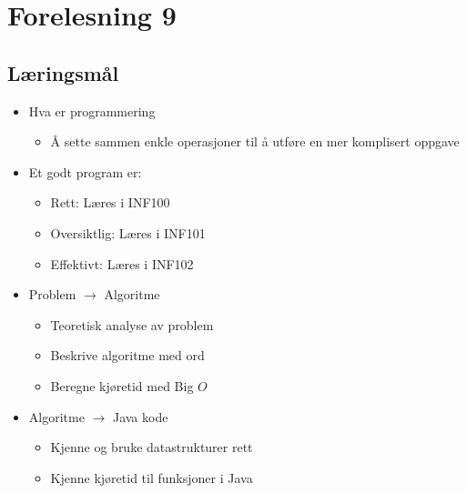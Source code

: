 \documentclass{article}
\begin{document}
    \section{Forelesning 9}
    \subsection{Læringsmål}

    \begin{itemize}
        \item Hva er programmering
            \begin{itemize}
                \item Å sette sammen enkle operasjoner til å utføre en mer komplisert oppgave
            \end{itemize}
        \item Et godt program er:
            \begin{itemize}
                \item Rett: Læres i INF100
                \item Oversiktlig: Læres i INF101
                \item Effektivt: Læres i INF102
            \end{itemize}
        \item Problem \( \rightarrow \) Algoritme
            \begin{itemize}
                \item Teoretisk analyse av problem
                \item Beskrive algoritme med ord
                \item Beregne kjøretid med Big \( O \)
            \end{itemize}
        \item Algoritme \( \rightarrow \) Java kode
            \begin{itemize}
                \item Kjenne og bruke datastrukturer rett
                \item Kjenne kjøretid til funksjoner i Java
            \end{itemize}
    \end{itemize}
\end{document}
